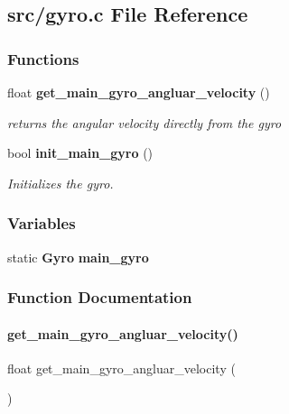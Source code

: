 \subsection{src/gyro.c File Reference}
\label{gyro_8c}
\subsubsection*{Functions}
\begin{DoxyCompactItemize}
\item 
float \textbf{ get\+\_\+main\+\_\+gyro\+\_\+angluar\+\_\+velocity} ()
\begin{DoxyCompactList}\small\item\em returns the angular velocity directly from the gyro \end{DoxyCompactList}\item 
bool \textbf{ init\+\_\+main\+\_\+gyro} ()
\begin{DoxyCompactList}\small\item\em Initializes the gyro. \end{DoxyCompactList}\end{DoxyCompactItemize}
\subsubsection*{Variables}
\begin{DoxyCompactItemize}
\item 
static \textbf{ Gyro} \textbf{ main\+\_\+gyro}
\end{DoxyCompactItemize}


\subsubsection{Function Documentation}
\mbox{\label{gyro_8c_aec0963ebe3eb6cdfd7edaf486bbb0a87}} 
\paragraph{get\+\_\+main\+\_\+gyro\+\_\+angluar\+\_\+velocity()}
{\footnotesize\ttfamily float get\+\_\+main\+\_\+gyro\+\_\+angluar\+\_\+velocity (\begin{DoxyParamCaption}{ }\end{DoxyParamCaption})}



